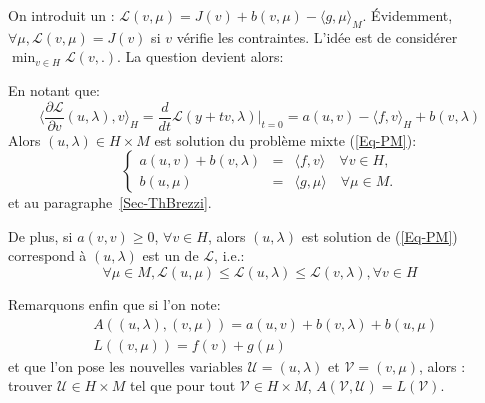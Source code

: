 \medskip



On introduit un :
$\mathscr{L}(v,\mu) = J(v)+b(v,\mu) - \langle g,\mu\rangle_M$.
Évidemment, $\forall\mu, \mathscr{L}(v,\mu)=J(v)$ si $v$ vérifie les contraintes.
L'idée est de considérer $\min_{v\in H} \mathscr{L}(v,.)$.
La question devient alors: 


\medskip



En notant que:
\begin{equation}\langle\frac{\partial\mathscr{L}}{\partial v}(u,\lambda),v\rangle_H
=\frac d{dt}\mathscr{L}(y+tv,\lambda)|_{t=0}
=a(u,v)-\langle f,v\rangle_H+b(v,\lambda)
\end{equation}
Alors $(u,\lambda) \in H\times M$ est solution du problème mixte (\ref{Eq-PM}):
 \begin{equation}\left\{
\begin{array}{rcl}
 a(u,v) + b(v, \lambda) &=& \langle f,v\rangle \quad \forall v\in H,\\
b(u,\mu) &=& \langle g,\mu\rangle \quad \forall \mu \in M.
\end{array}\right.
\end{equation}
et  au paragraphe~\ref{Sec-ThBrezzi}.

\medskip
De plus, si $a(v,v)\ge 0$, $\forall v\in H$, alors $(u,\lambda)$ est
solution de (\ref{Eq-PM}) correspond à $(u,\lambda)$ est un 
de $\mathscr{L}$, i.e.:
\begin{equation}
\forall\mu\in M, \mathscr{L}(u,\mu) \le \mathscr{L}(u,\lambda) \le
\mathscr{L}(v,\lambda), \forall v\in H
\end{equation}


\medskip
Remarquons enfin que si l'on note:
\begin{align}&A((u,\lambda),(v,\mu))=a(u,v)+b(v,\lambda)+b(u,\mu)\\
&L((v,\mu))=f(v)+g(\mu)\end{align}
et que l'on pose les nouvelles variables $\mathscr{U}=(u,\lambda)$ et $\mathscr{V}=(v,\mu)$,
alors : trouver $\mathscr{U}\in H\times M$
tel que pour tout $\mathscr{V}\in H\times M$, $A(\mathscr{V},\mathscr{U})=L(\mathscr{V})$.


